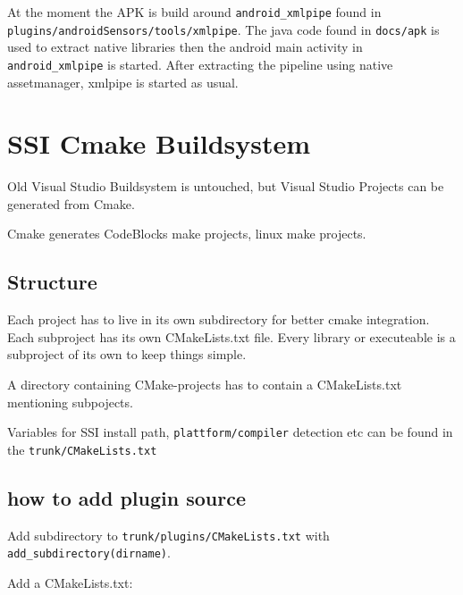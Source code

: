 \documentclass[
10pt, %
a4paper, %
oneside, %
headinclude,footinclude, %
BCOR5mm, %
]{scrartcl}
\begin{document}
At the moment the APK is build around \verb|android_xmlpipe| found in
\verb|plugins/androidSensors/tools/xmlpipe|.
The java code found in \verb|docs/apk| is used to extract native libraries then the android main activity in \verb|android_xmlpipe| is started.
After extracting the pipeline using native assetmanager, xmlpipe is started as usual.

\section{SSI Cmake Buildsystem}

Old Visual Studio Buildsystem is untouched,
but Visual Studio Projects can be generated from Cmake.

Cmake generates CodeBlocks make projects, linux make projects.



\subsection{Structure}

Each project has to live in its own subdirectory for better cmake integration.
Each subproject has its own CMakeLists.txt file.
Every library or executeable is a subproject of its own to keep things simple.

A directory containing CMake-projects has to contain a CMakeLists.txt mentioning subpojects.

Variables for SSI install path, \verb|plattform/compiler| detection etc can be found in the \verb|trunk/CMakeLists.txt|


\subsection{how to add plugin source}

Add subdirectory to \verb|trunk/plugins/CMakeLists.txt|
with \verb|add_subdirectory(dirname)|.

Add a CMakeLists.txt:
\end{document}

